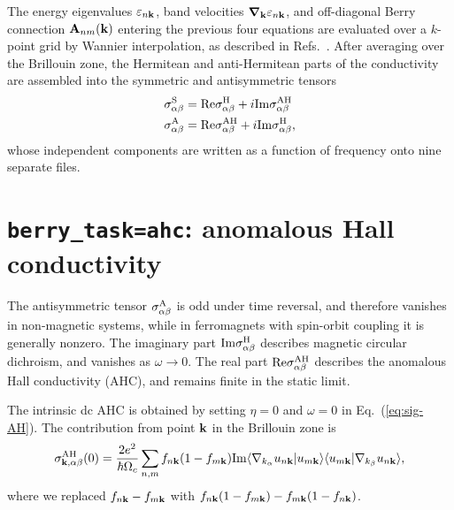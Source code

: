 The energy eigenvalues $\varepsilon_{n\bf k}$, band velocities
$\bm{\nabla}_{\bf k}\varepsilon_{n{\bf k}}$, and off-diagonal Berry
connection ${\bf A}_{nm}({\bf k})$ entering the previous four
equations are evaluated over a $k$-point grid by Wannier
interpolation, as described in Refs.~\cite{wang-prb06,yates-prb07}.
After averaging over the Brillouin zone, the Hermitean and
anti-Hermitean parts of the conductivity are assembled into the
symmetric and antisymmetric tensors
%
\begin{align}
\sigma^{\rm S}_{\alpha\beta}&=
{\rm Re}\sigma^{\rm H}_{\alpha\beta}+i{\rm Im}\sigma^{\rm AH}_{\alpha\beta}\\
\sigma^{\rm A}_{\alpha\beta}&=
{\rm Re}\sigma^{\rm AH}_{\alpha\beta}+i{\rm Im}\sigma^{\rm H}_{\alpha\beta},
\end{align}
%
whose independent components are written as a function of frequency
onto nine separate files.

\section{{\tt berry\_task=ahc}: anomalous Hall conductivity}

The antisymmetric tensor $\sigma^{\rm A}_{\alpha\beta}$ is odd under
time reversal, and therefore vanishes in non-magnetic systems, while
in ferromagnets with spin-orbit coupling it is generally nonzero.  The
imaginary part ${\rm Im}\sigma^{\rm H}_{\alpha\beta}$ describes
magnetic circular dichroism, and vanishes as $\omega\rightarrow
0$. The real part ${\rm Re}\sigma^{\rm AH}_{\alpha\beta}$ describes
the anomalous Hall conductivity (AHC), and remains finite in the
static limit.

The intrinsic dc AHC is obtained by setting $\eta=0$ and $\omega=0$ in
Eq.~(\ref{eq:sig-AH}). The contribution from point ${\bf k}$ in the
Brillouin zone is
%
\begin{equation}
\sigma^{\rm AH}_{{\bf k},\alpha\beta}(0)=\frac{2e^2}{\hbar\Omega_c}
\sum_{n,m}f_{n\bf k}(1-f_{m\bf k})
{\rm Im}\langle \nabla_{k_\alpha} u_{n\bf k}\vert u_{m\bf k}\rangle
\langle u_{m\bf k}\vert\nabla_{k_\beta} u_{n\bf k}\rangle,
\end{equation}
%
where we replaced $f_{n\bf k}-f_{m\bf k}$ with 
$f_{n\bf k}(1-f_{m\bf k})-f_{m\bf k}(1-f_{n\bf k})$.

